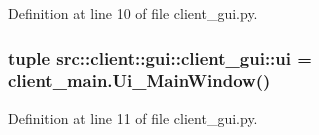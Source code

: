 Definition at line 10 of file client\_\-gui.py.

\hypertarget{namespacesrc_1_1client_1_1gui_1_1client__gui_a4f6573094992de7d77ef40f18b7d7567}{
\subsubsection[{ui}]{\setlength{\rightskip}{0pt plus 5cm}tuple {\bf src::client::gui::client\_\-gui::ui} = {\bf client\_\-main.Ui\_\-MainWindow}()}}
\label{namespacesrc_1_1client_1_1gui_1_1client__gui_a4f6573094992de7d77ef40f18b7d7567}


Definition at line 11 of file client\_\-gui.py.


